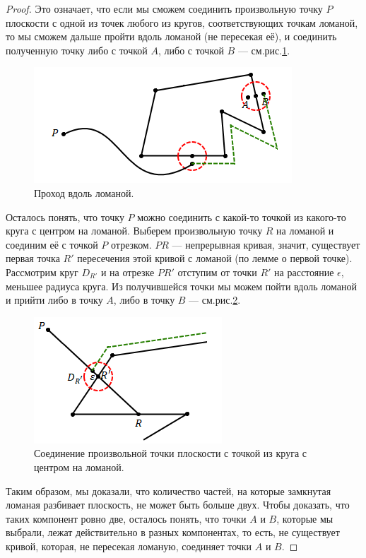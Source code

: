 \begin{proof}
    Это означает, что если мы сможем соединить произвольную точку $P$ плоскости с одной из точек любого из кругов, соответствующих точкам ломаной, то мы сможем дальше пройти вдоль ломаной (не пересекая её), и соединить полученную точку либо с точкой $A$, либо с точкой $B$ — см.рис.\ref{fig:c4.3}.

    \begin{figure}[h]
        \centering
        \includegraphics{images/c4.3.png}
        \caption{Проход вдоль ломаной.}
        \label{fig:c4.3}
    \end{figure}

    Осталось понять, что точку $P$ можно соединить с какой-то точкой из какого-то круга с центром на ломаной.
    Выберем произвольную точку $R$ на ломаной и соединим её с точкой $P$ отрезком. $PR$ — непрерывная кривая, значит, существует первая точка $R'$ пересечения этой кривой с ломаной (по лемме о первой точке). Рассмотрим круг $D_{R'}$ и на отрезке $PR'$ отступим от точки $R'$ на расстояние $\epsilon$, меньшее радиуса круга. Из получившейся точки мы можем пойти вдоль ломаной и прийти либо в точку $A$, либо в точку $B$ — см.рис.\ref{fig:c4.4}.

    \begin{figure}[h]
        \centering
        \includegraphics{images/c4.4.png}
        \caption{Соединение произвольной точки плоскости с точкой из круга с центром на ломаной.}
        \label{fig:c4.4}
    \end{figure}

    Таким образом, мы доказали, что количество частей, на которые замкнутая ломаная разбивает плоскость, не может быть больше двух. Чтобы доказать, что таких компонент ровно две, осталось понять, что точки $A$ и $B$, которые мы выбрали, лежат действительно в разных компонентах, то есть, не существует кривой, которая, не пересекая ломаную, соединяет точки $A$ и $B$.


\end{proof}
